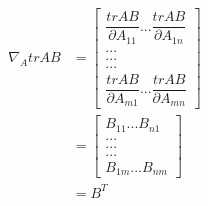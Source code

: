 \begin{equation}
\begin{split}
  \nabla_A trAB &=
  \begin{bmatrix}
    \dfrac{trAB}{\partial A_{11}} ... \dfrac{trAB}{\partial A_{1n}}\\
    . .   .\\
    .  .  .\\
    .   . .\\
    \dfrac{trAB}{\partial A_{m1}} ... \dfrac{trAB}{\partial A_{mn}}
  \end{bmatrix} \\
  &=
  \begin{bmatrix}
    B_{11} ... B_{n1}\\
    . .   .\\
    .  .  .\\
    .   . .\\
    B_{1m} ... B_{nm}
  \end{bmatrix} \\
  &= B^T
\end{split}
\end{equation}
